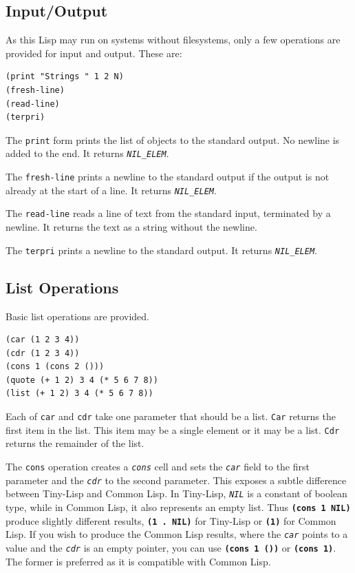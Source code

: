 \documentclass[10pt, openany]{book}
\newcommand{\operation}[1]{\textbf{\texttt{#1}}}
\newcommand{\function}[1]{\texttt{#1}}
\newcommand{\constant}[1]{\emph{\texttt{#1}}}
\newcommand{\tl}{Tiny-Lisp}
\newcommand{\cl}{Common Lisp}
\begin{document}
\subsection{Input/Output}
As this Lisp may run on systems without filesystems, only a few operations are provided for input and output.  These are:

\begin{lstlisting}
(print "Strings " 1 2 N)
(fresh-line)
(read-line)
(terpri)
\end{lstlisting}

The \function{print} form prints the list of objects to the standard output.  No newline is added to the end.  It returns \constant{NIL\_ELEM}.

The \function{fresh-line} prints a newline to the standard output if the output is not already at the start of a line.  It returns \constant{NIL\_ELEM}.

The \function{read-line} reads a line of text from the standard input, terminated by a newline.  It returns the text as a string without the newline.

The \function{terpri} prints a newline to the standard output.  It returns \constant{NIL\_ELEM}.

\subsection{List Operations}
Basic list operations are provided.
\begin{lstlisting}
(car (1 2 3 4))
(cdr (1 2 3 4))
(cons 1 (cons 2 ()))
(quote (+ 1 2) 3 4 (* 5 6 7 8))
(list (+ 1 2) 3 4 (* 5 6 7 8))
\end{lstlisting}

Each of \function{car} and \function{cdr} take one parameter that should be a list.  \function{Car} returns the first item in the list.  This item may be a single element or it may be a list.  \function{Cdr} returns the remainder of the list.

The \function{cons} operation creates a \constant{cons} cell and sets the \constant{car} field to the first parameter and the \constant{cdr} to the second parameter.  This exposes a subtle difference between \tl{} and \cl.  In \tl, \constant{NIL} is a constant of boolean type, while in \cl, it also represents an empty list.  Thus \operation{(cons 1 NIL)} produce slightly different results, \operation{(1 . NIL)} for \tl{} or \operation{(1)} for \cl.  If you wish to produce the \cl{} results, where the \constant{car} points to a value and the \constant{cdr} is an empty pointer, you can use \operation{(cons 1 ())} or \operation{(cons 1)}.  The former is preferred as it is compatible with \cl.
\end{document}
